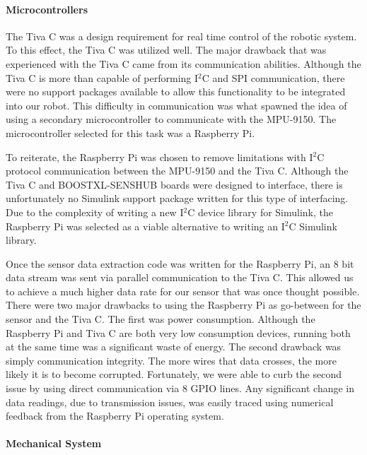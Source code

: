 \documentclass[11pt]{report}
\begin{document}
\begin{spacing}{1.5}
        
        \paragraph{Microcontrollers}
        
        The Tiva C was a design requirement for real time control of the robotic system.  To this effect, the Tiva C was utilized well.  The major drawback that was experienced with the Tiva C came from its communication abilities.  Although the Tiva C is more than capable of performing I$^2$C and SPI communication, there were no support packages available to allow this functionality to be integrated into our robot.  This difficulty in communication was what spawned the idea of using a secondary microcontroller to communicate with the MPU-9150.  The microcontroller selected for this task was a Raspberry Pi.

        To reiterate, the Raspberry Pi was chosen to remove limitations with I$^2$C protocol communication between the MPU-9150 and the Tiva C.  Although the Tiva C and BOOSTXL-SENSHUB boards were designed to interface, there is unfortunately no Simulink support package written for this type of interfacing.  Due to the complexity of writing a new I$^2$C device library for Simulink, the Raspberry Pi was selected as a viable alternative to writing an I$^2$C Simulink library.

        Once the sensor data extraction code was written for the Raspberry Pi, an 8 bit data stream was sent via parallel communication to the Tiva C.  This allowed us to achieve a much higher data rate for our sensor that was once thought possible.  There were two major drawbacks to using the Raspberry Pi as go-between for the sensor and the Tiva C.  The first was power consumption.  Although the Raspberry Pi and Tiva C are both very low consumption devices, running both at the same time was a significant waste of energy.  The second drawback was simply communication integrity.  The more wires that data crosses, the more likely it is to become corrupted.  Fortunately, we were able to curb the second issue by using direct communication via 8 GPIO lines.  Any significant change in data readings, due to transmission issues, was easily traced using numerical feedback from the Raspberry Pi operating system.

        \paragraph{Mechanical System}
        

\end{spacing}
\end{document}
